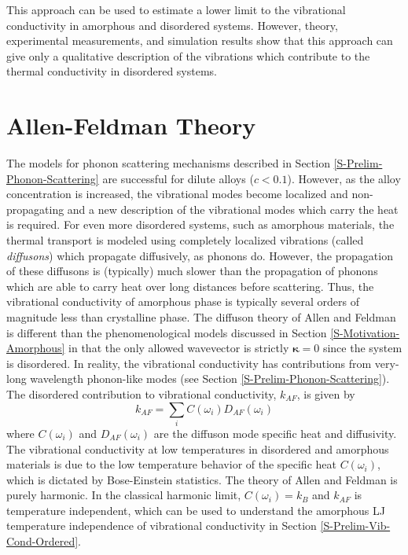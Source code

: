 \documentclass[aps,prb,preprint,superscriptaddress,amsmath,amssymb,floatfix]{revtex4}
\begin{document}
This approach can be used to estimate a lower limit to the vibrational 
conductivity in amorphous and disordered systems.
\cite{cahill_lower_1992,cahill_thermal_1987} 
However, theory,\cite{allen_thermal_1993} experimental measurements,
\cite{graebner_phonon_1986} and simulation results
\cite{shenogin_predicting_2009} show that this approach can give only a 
qualitative description of the vibrations which contribute to the thermal 
conductivity in disordered systems.

\section{\label{S:Lifetimes}Allen-Feldman Theory}
The models for phonon scattering mechanisms described in Section 
\ref{S-Prelim-Phonon-Scattering} are successful for dilute alloys 
($c<0.1$).\cite{klemens1955,klemens1957} However, as the alloy 
concentration is increased, the vibrational modes become localized and 
non-propagating and a new description of the vibrational modes which 
carry the heat is required. For even more disordered systems, such as 
amorphous materials, the thermal transport is modeled using completely 
localized vibrations (called \emph{diffusons}) which propagate diffusively, 
as phonons do.\cite{allen1993} However, the propagation of these diffusons 
is (typically) much slower than the propagation of phonons which are able 
to carry heat over long distances before scattering. Thus, the vibrational 
conductivity of amorphous phase is typically several orders of magnitude 
less than crystalline phase.\cite{freeman1986,cahill1992}
The diffuson theory of Allen and Feldman is different than the 
phenomenological models discussed in Section \ref{S-Motivation-Amorphous} 
in that the only allowed wavevector is strictly $\mathbf{\kappa}= 0$ since 
the system is disordered. In reality, the vibrational conductivity has 
contributions from very-long wavelength phonon-like modes (see Section 
\ref{S-Prelim-Phonon-Scattering}). The disordered contribution to 
vibrational conductivity, $k_{AF}$, is given by
\begin{equation}\label{EQ:M:k_AF}
k_{AF} = \sum_i C(\omega_i) D_{AF}(\omega_i)
\end{equation}
where $C(\omega_i)$ and $D_{AF}(\omega_i)$ are the diffuson mode specific 
heat and diffusivity. The vibrational conductivity at low temperatures in 
disordered and amorphous materials is due to the low temperature behavior 
of the specific heat $C(\omega_i)$, which is dictated by Bose-Einstein 
statistics.\cite{allen1993} The theory of Allen and Feldman is purely 
harmonic. In the classical harmonic limit, $C(\omega_i) = k_{B}$ and 
$k_{AF}$ is temperature independent, which can be used to understand the 
amorphous LJ temperature independence of vibrational conductivity in Section 
\ref{S-Prelim-Vib-Cond-Ordered}.
\end{document}
